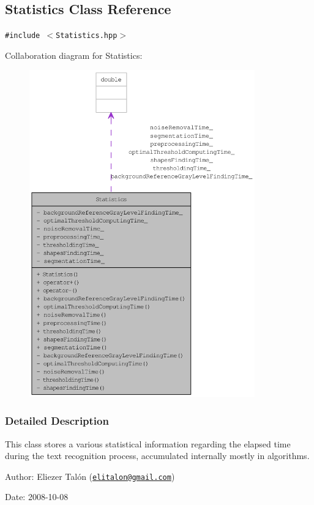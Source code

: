 \hypertarget{class_statistics}{
\subsection{Statistics Class Reference}
\label{class_statistics}
}
{\tt \#include $<$Statistics.hpp$>$}

Collaboration diagram for Statistics:\nopagebreak
\begin{figure}[H]
\begin{center}
\leavevmode
\includegraphics[height=400pt]{class_statistics__coll__graph}
\end{center}
\end{figure}


\subsubsection{Detailed Description}
This class stores a various statistical information regarding the elapsed time during the text recognition process, accumulated internally mostly in algorithms.

\begin{Desc}
\item[Author:]Eliezer Talón (\href{mailto:elitalon@gmail.com}{\tt elitalon@gmail.com}) \end{Desc}
\begin{Desc}
\item[Date:]2008-10-08 \end{Desc}
